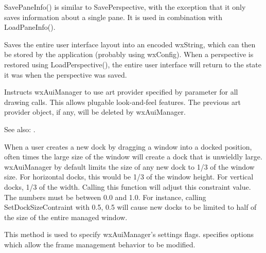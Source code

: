 
SavePaneInfo() is similar to SavePerspective, with the exception that it only saves information about a single pane.  It is used in combination with LoadPaneInfo().

\label{wxauimanagersaveperspective}


Saves the entire user interface layout into an encoded wxString, which
can then be stored by the application (probably using wxConfig). When
a perspective is restored using LoadPerspective(), the entire user
interface will return to the state it was when the perspective was saved.

\label{wxauimanagersetartprovider}


Instructs wxAuiManager to use art provider specified by parameter
 for all drawing calls. This allows plugable
look-and-feel features. The previous art provider object, if any,
will be deleted by wxAuiManager.

See also: .

\label{wxauimanagersetdocksizeconstraint}


When a user creates a new dock by dragging a window into a docked position, often times the large size of the
window will create a dock that is unwieldly large.  wxAuiManager by default limits the size of any
new dock to 1/3 of the window size.  For horizontal docks, this would be 1/3 of the window height.  For
vertical docks, 1/3 of the width.  Calling this function will adjust this constraint value.  The numbers
must be between 0.0 and 1.0.  For instance, calling SetDockSizeContraint with 0.5, 0.5 will cause new
docks to be limited to half of the size of the entire managed window. 

\label{wxauimanagersetflags}


This method is used to specify wxAuiManager's settings flags. 
specifies options which allow the frame management behavior to be modified.

